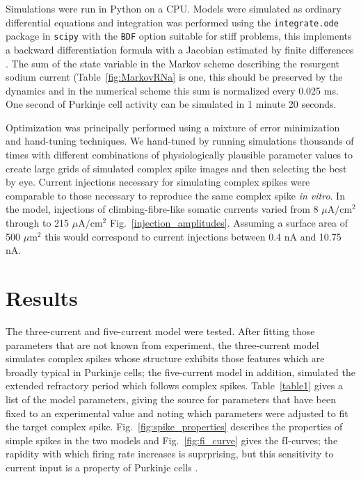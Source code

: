 \documentclass[twocolumn]{svjour3}          %
\begin{document}
Simulations were run in Python on a CPU. Models were simulated as
ordinary differential equations and integration was performed using
the \texttt{integrate.ode} package in \texttt{scipy} with the
\texttt{BDF} option suitable for stiff problems, this implements a
backward differentiation formula with a Jacobian estimated by finite
differences \citep{ByrneHindmarsh1975}. The sum of the state variable
in the Markov scheme describing the resurgent sodium current
(Table~\ref{fig:MarkovRNa} is one, this should be preserved by the
dynamics and in the numerical scheme this sum is normalized every
0.025 ms. One second of Purkinje cell activity can be simulated in 1
minute 20 seconds.

Optimization was principally performed using a mixture of error
minimization and hand-tuning techniques. We hand-tuned by running
simulations thousands of times with different combinations of
physiologically plausible parameter values to create large grids of
simulated complex spike images and then selecting the best by
eye. Current injections necessary for simulating complex spikes were
comparable to those necessary to reproduce the same complex spike
\textit{in vitro}. In the model, injections of climbing-fibre-like
somatic currents varied from 8 $\mu$A$/$cm$^2$ through to 215
$\mu$A$/$cm$^2$ Fig.~\ref{injection_amplitudes}. Assuming a surface
area of 500 $\mu$m$^2$ this would correspond to current injections
between 0.4 nA and 10.75 nA.

\section{Results}

The three-current and five-current model were tested. After fitting
those parameters that are not known from experiment, the three-current
model simulates complex spikes whose structure exhibits those features
which are broadly typical in Purkinje cells; the five-current model in
addition, simulated the extended refractory period which follows
complex spikes. Table~\ref{table1} gives a list of the model
parameters, giving the source for parameters that have been fixed to
an experimental value and noting which parameters were adjusted to fit
the target complex spike. Fig.~\ref{fig:spike_properties} describes
the properties of simple spikes in the two models and
Fig.~\ref{fig:fi_curve} gives the fI-curves; the rapidity with which
firing rate increases is suprprising, but this sensitivity to current
input is a property of Purkinje cells \cite{DeSchutterBower1994a}.
\end{document}

